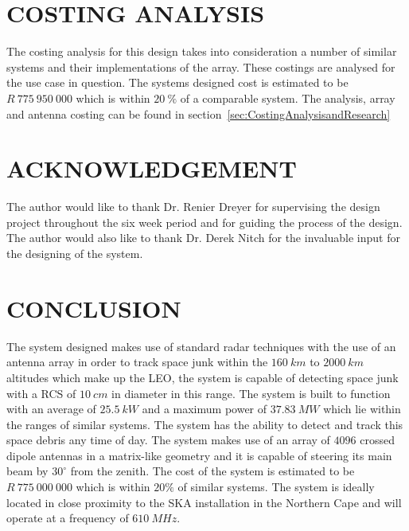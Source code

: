 \documentclass[11pt]{witseiepaper}
\begin{document}
\begin{bibunit}[witseie]

\section{COSTING ANALYSIS} \label{sec:CostingAnalysis}
The costing analysis for this design takes into consideration a number of similar systems and their implementations of the array. These costings are analysed for the use case in question.
The systems designed cost is estimated to be $R~775~950~000$ which is within $20~\%$ of a comparable system.
The analysis, array and antenna costing can be found in section~\ref{sec:CostingAnalysisandResearch}


\section*{ACKNOWLEDGEMENT} \label{sec:ACKNOWLEDGEMENT}
The author would like to thank Dr. Renier Dreyer for supervising the design project throughout the six week period and for guiding the process of the design.
The author would also like to thank Dr. Derek Nitch for the invaluable input for the designing of the system.


\section{CONCLUSION} \label{sec:CONCLUSION}
The system designed makes use of standard radar techniques with the use of an antenna array in order to track space junk within the $160~km$ to $2000~km$ altitudes which make up the LEO, the system is capable of detecting space junk with a RCS of $10~cm$ in diameter in this range. The system is built to function with an average of $25.5~kW$ and a maximum power of $37.83~MW$ which lie within the ranges of similar systems. The system has the ability to detect and track this space debris any time of day. The system makes use of an array of $4096$ crossed dipole antennas in a matrix-like geometry and it is capable of steering its main beam by $30^{\circ}$ from the zenith.
The cost of the system is estimated to be $R~775~000~000$ which is within $20\%$ of similar systems. The system is ideally located in close proximity to the SKA installation in the Northern Cape and will operate at a frequency of $610~MHz$.   
% 
% 

\putbib[references]
\end{bibunit}
\end{document}
